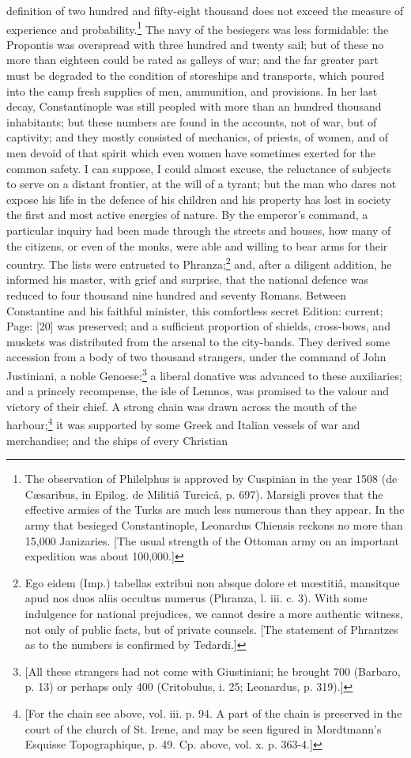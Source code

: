 definition of two hundred and fifty-eight thousand does not exceed the measure of experience and probability.\footnote{The observation of Philelphus is approved by Cuspinian in the year 1508 (de Cæsaribus, in Epilog. de Militiâ Turcicâ, p. 697). Marsigli proves that the effective armies of the Turks are much less numerous than they appear. In the army that besieged Constantinople, Leonardus Chiensis reckons no more than 15,000 Janizaries. [The usual strength of the Ottoman army on an important expedition was about 100,000.]} The navy of the besiegers was less formidable: the Propontis was overspread with three hundred and twenty sail; but of these no more than eighteen could be rated as galleys of war; and the far greater part must be degraded to the condition of storeships and transports, which poured into the camp fresh supplies of men, ammunition, and provisions. In her last decay, Constantinople was still peopled with more than an hundred thousand inhabitants; but these numbers are found in the accounts, not of war, but of captivity; and they mostly consisted of mechanics, of priests, of women, and of men devoid of that spirit which even women have sometimes exerted for the common safety. I can suppose, I could almost excuse, the reluctance of subjects to serve on a distant frontier, at the will of a tyrant; but the man who dares not expose his life in the defence of his children and his property has lost in society the first and most active energies of nature. By the emperor\texthebrew{}’s command, a particular inquiry had been made through the streets and houses, how many of the citizens, or even of the monks, were able and willing to bear arms for their country. The lists were entrusted to Phranza;\footnote{Ego eidem (Imp.) tabellas extribui non absque dolore et mœstitiâ, mansitque apud nos duos aliis occultus numerus (Phranza, l. iii. c. 3). With some indulgence for national prejudices, we cannot desire a more authentic witness, not only of public facts, but of private counsels. [The statement of Phrantzes as to the numbers is confirmed by Tedardi.]} and, after a diligent addition, he informed his master, with grief and surprise, that the national defence was reduced to four thousand nine hundred and seventy Romans. Between Constantine and his faithful minister, this comfortless secret Edition: current; Page: [20] was preserved; and a sufficient proportion of shields, cross-bows, and muskets was distributed from the arsenal to the city-bands. They derived some accession from a body of two thousand strangers, under the command of John Justiniani, a noble Genoese;\footnote{[All these strangers had not come with Giustiniani; he brought 700 (Barbaro, p. 13) or perhaps only 400 (Critobulus, i. 25; Leonardus, p. 319).]} a liberal donative was advanced to these auxiliaries; and a princely recompense, the isle of Lemnos, was promised to the valour and victory of their chief. A strong chain was drawn across the mouth of the harbour;\footnote{[For the chain see above, vol. iii. p. 94. A part of the chain is preserved in the court of the church of St. Irene, and may be seen figured in Mordtmann\texthebrew{}’s Esquisse Topographique, p. 49. Cp. above, vol. x. p. 363-4.]} it was supported by some Greek and Italian vessels of war and merchandise; and the ships of every Christian 